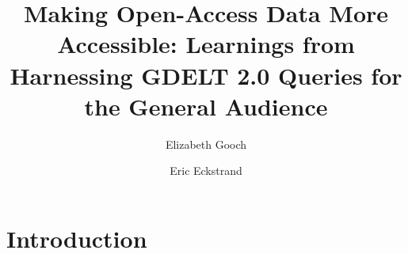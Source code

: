 \documentclass[preprint,authoryear,12pt]{elsarticle/elsarticle}
\begin{document}
\begin{frontmatter}



\title{Making Open-Access Data More Accessible: Learnings from Harnessing GDELT 2.0 Queries for the General Audience
}


\author[add1]{Elizabeth Gooch}
\author[add2]{Eric Eckstrand}

\address[add1]{Defense Resources Management Institute, Naval Postgraduate School}
\address[add2]{Data Science Analytics Group, Naval Postgraduate School}

\begin{abstract}

\end{abstract}

\begin{keyword}


\end{keyword}

\end{frontmatter}


\section{Introduction}
\label{sec:intro}
\end{document}
